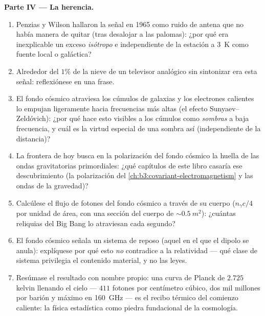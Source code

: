 \begin{problem}
\medskip\noindent\textbf{Parte IV --- La herencia.}
\begin{enumerate}[resume]
  \item Penzias y Wilson hallaron la señal en 1965 como
        ruido de antena que no había manera de quitar (tras desalojar a las palomas):
        ¿por qué era inexplicable un exceso \emph{isótropo} e independiente de la
        estación a \qty{3}{K} como fuente local o galáctica?
  \item Alrededor del $1\%$ de la nieve de un televisor analógico sin sintonizar
        era esta señal: reflexiónese en una frase.
  \item El fondo cósmico atraviesa los cúmulos de galaxias y los electrones
        calientes lo empujan ligeramente hacia frecuencias más altas (el efecto
        Sunyaev--Zeldóvich): ¿por qué hace esto visibles a los cúmulos
        como \emph{sombras} a baja frecuencia, y cuál es la virtud especial
        de una sombra así (independiente de la
        distancia)?
  \item La frontera de hoy busca en la polarización del fondo cósmico la
        huella de las ondas gravitatorias primordiales: ¿qué capítulos
        de este libro casaría ese descubrimiento
        (la polarización del \cref{ch:b3:covariant-electromagnetism}
        y las ondas de la gravedad)?
  \item Calcúlese el flujo de fotones del fondo cósmico a través de su cuerpo
        ($n_\gamma c/4$ por unidad de área, con una sección del cuerpo
        de $\sim\qty{0.5}{m^2}$): ¿cuántas reliquias del Big Bang
        lo atraviesan cada segundo?
  \item El fondo cósmico señala un sistema de reposo (aquel en el que el
        dipolo se anula): explíquese por qué esto \emph{no}
        contradice a la relatividad --- qué clase de sistema privilegia
        el contenido material, y no las leyes.
  \item Resúmase el resultado con nombre propio: una curva de Planck de
        $2.725$ kelvin llenando el cielo --- $411$ fotones por centímetro
        cúbico, dos mil millones por barión y máximo en
        \qty{160}{GHz} --- es el recibo térmico del comienzo
        caliente: la física estadística como piedra fundacional de la
        cosmología.
\end{enumerate}
\end{problem}
